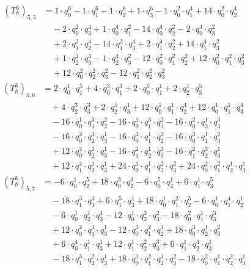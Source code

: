 \begin{align*}(T_{h}^3)_{5,5}&=1\cdot q_0^{6}-1\cdot q_1^{6}-1\cdot q_2^{6}+1\cdot q_3^{6}-1\cdot q_0^{2}\cdot q_1^{4}+14\cdot q_0^{2}\cdot q_2^{4}\\
&\quad -2\cdot q_0^{2}\cdot q_3^{4}+1\cdot q_0^{4}\cdot q_1^{2}-14\cdot q_0^{4}\cdot q_2^{2}-2\cdot q_0^{4}\cdot q_3^{2}\\
&\quad +2\cdot q_1^{2}\cdot q_2^{4}-14\cdot q_1^{2}\cdot q_3^{4}+2\cdot q_1^{4}\cdot q_2^{2}+14\cdot q_1^{4}\cdot q_3^{2}\\
&\quad +1\cdot q_2^{2}\cdot q_3^{4}-1\cdot q_2^{4}\cdot q_3^{2}-12\cdot q_0^{2}\cdot q_1^{2}\cdot q_2^{2}+12\cdot q_0^{2}\cdot q_1^{2}\cdot q_3^{2}\\
&\quad +12\cdot q_0^{2}\cdot q_2^{2}\cdot q_3^{2}-12\cdot q_1^{2}\cdot q_2^{2}\cdot q_3^{2}\end{align*}
\begin{align*}(T_{h}^3)_{5,6}&=2\cdot q_0^{1}\cdot q_1^{5}+4\cdot q_0^{3}\cdot q_1^{3}+2\cdot q_0^{5}\cdot q_1^{1}+2\cdot q_2^{1}\cdot q_3^{5}\\
&\quad +4\cdot q_2^{3}\cdot q_3^{3}+2\cdot q_2^{5}\cdot q_3^{1}+12\cdot q_0^{1}\cdot q_1^{1}\cdot q_2^{4}+12\cdot q_0^{1}\cdot q_1^{1}\cdot q_3^{4}\\
&\quad -16\cdot q_0^{1}\cdot q_1^{3}\cdot q_2^{2}-16\cdot q_0^{1}\cdot q_1^{3}\cdot q_3^{2}-16\cdot q_0^{2}\cdot q_2^{1}\cdot q_3^{3}\\
&\quad -16\cdot q_0^{2}\cdot q_2^{3}\cdot q_3^{1}-16\cdot q_0^{3}\cdot q_1^{1}\cdot q_2^{2}-16\cdot q_0^{3}\cdot q_1^{1}\cdot q_3^{2}\\
&\quad +12\cdot q_0^{4}\cdot q_2^{1}\cdot q_3^{1}-16\cdot q_1^{2}\cdot q_2^{1}\cdot q_3^{3}-16\cdot q_1^{2}\cdot q_2^{3}\cdot q_3^{1}\\
&\quad +12\cdot q_1^{4}\cdot q_2^{1}\cdot q_3^{1}+24\cdot q_0^{1}\cdot q_1^{1}\cdot q_2^{2}\cdot q_3^{2}+24\cdot q_0^{2}\cdot q_1^{2}\cdot q_2^{1}\cdot q_3^{1}\end{align*}
\begin{align*}(T_{h}^3)_{5,7}&=-6\cdot q_0^{1}\cdot q_2^{5}+18\cdot q_0^{3}\cdot q_2^{3}-6\cdot q_0^{5}\cdot q_2^{1}+6\cdot q_1^{1}\cdot q_3^{5}\\
&\quad -18\cdot q_1^{3}\cdot q_3^{3}+6\cdot q_1^{5}\cdot q_3^{1}+18\cdot q_0^{1}\cdot q_1^{2}\cdot q_2^{3}-6\cdot q_0^{1}\cdot q_1^{4}\cdot q_2^{1}\\
&\quad -6\cdot q_0^{1}\cdot q_2^{1}\cdot q_3^{4}-12\cdot q_0^{1}\cdot q_2^{3}\cdot q_3^{2}-18\cdot q_0^{2}\cdot q_1^{1}\cdot q_3^{3}\\
&\quad +12\cdot q_0^{2}\cdot q_1^{3}\cdot q_3^{1}-12\cdot q_0^{3}\cdot q_1^{2}\cdot q_2^{1}+18\cdot q_0^{3}\cdot q_2^{1}\cdot q_3^{2}\\
&\quad +6\cdot q_0^{4}\cdot q_1^{1}\cdot q_3^{1}+12\cdot q_1^{1}\cdot q_2^{2}\cdot q_3^{3}+6\cdot q_1^{1}\cdot q_2^{4}\cdot q_3^{1}\\
&\quad -18\cdot q_1^{3}\cdot q_2^{2}\cdot q_3^{1}+18\cdot q_0^{1}\cdot q_1^{2}\cdot q_2^{1}\cdot q_3^{2}-18\cdot q_0^{2}\cdot q_1^{1}\cdot q_2^{2}\cdot q_3^{1}\end{align*}
